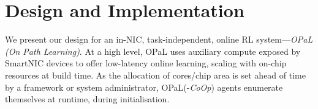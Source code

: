 \documentclass[
sigconf,natbib=false
,anonymous=true
,10pt
]{acmart}
\newcommand{\approach}{On Path Learning}
\newcommand{\approachshort}{OPaL}
\newcommand{\Coopfw}{\emph{CoOp}}
\newcounter{insightc}
\newenvironment{insight}
	{
		\begin{tipblock}\refstepcounter{insightc}\textbf{Insight \theinsightc:}\em
	}
	{
		\end{tipblock}
	}
\begin{document}


\section{Design and Implementation}\label{sec:design}
We present our design for an in-NIC, task-independent, online RL system---\emph{\approachshort{} (\approach)}.
At a high level, \approachshort{} uses auxiliary compute exposed by SmartNIC devices to offer low-latency online learning, scaling with on-chip resources at build time.
As the allocation of cores/chip area is set ahead of time by a framework or system administrator, \approachshort{}(-\Coopfw) agents enumerate themselves at runtime, during initialisation.
\end{document}

